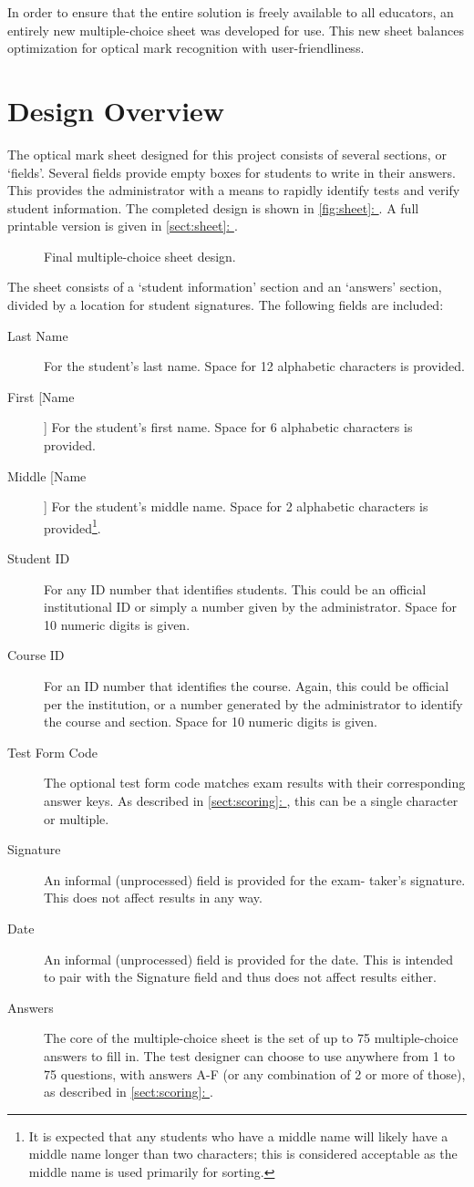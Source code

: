 \documentclass[12pt, letterpaper]{report}
\newcommand*{\sectionref}[1]{\hypersetup{linkcolor=usfgreen}\hyperref[{#1}]{\ref*{#1}: \nameref*{#1}}}
\newcommand*{\itemref}[1]{\hypersetup{linkcolor=usfgreen}\hyperref[{#1}]{\autoref*{#1}: \nameref*{#1}}}
\newcommand*{\boxedimage}[1]{\fbox{\texttt{[image: \#1]}}}
\newcommand{\fig}[3]{
  \begin{figure}[h]
    \caption{#1}
    \label{#3}
    \centering
    \boxedimage{#2}
  \end{figure}
}
\begin{document}
In order to ensure that the entire solution is freely available to all
educators, an entirely new multiple-choice sheet was developed for use.
This new sheet balances optimization for optical mark recognition with
user-friendliness.
\section{Design Overview}
The optical mark sheet designed for this project consists of several sections,
or `fields'. Several fields provide empty boxes for students to write in their
answers. This provides the administrator with a means to rapidly identify tests
and verify student information. The completed design is shown in
\itemref{fig:sheet}. A full printable version is given in \sectionref{sect:sheet}.

\fig{Final multiple-choice sheet design.}{sheet.png}{fig:sheet}

The sheet consists of a `student information' section and an `answers' section,
divided by a location for student signatures. The following fields are
included:
\begin{description}
  \item[Last Name] For the student's last name. Space for 12 alphabetic
  characters is provided.
  \item[First [Name]] For the student's first name. Space for 6 alphabetic
  characters is provided.
  \item[Middle [Name]] For the student's middle name. Space for 2 alphabetic
  characters is provided\footnote{It is expected that any students who have a
  middle name will likely have a middle name longer than two characters; this
  is considered acceptable as the middle name is used primarily for sorting.}.
  \item[Student ID] For any ID number that identifies students. This could be an
  official institutional ID or simply a number given by the administrator. Space
  for 10 numeric digits is given.
  \item[Course ID] For an ID number that identifies the course. Again, this
  could be official per the institution, or a number generated by the
  administrator to identify the course and section. Space for 10 numeric digits
  is given.
  \item[Test Form Code] The optional test form code matches exam results with
  their corresponding answer keys. As described in \sectionref{sect:scoring}, this can
  be a single character or multiple.
  \item[Signature] An informal (unprocessed) field is provided for the exam-
  taker's signature. This does not affect results in any way.
  \item[Date] An informal (unprocessed) field is provided for the date. This is
  intended to pair with the Signature field and thus does not affect results
  either.
  \item[Answers] The core of the multiple-choice sheet is the set of up to 75
  multiple-choice answers to fill in. The test designer can choose to use
  anywhere from 1 to 75 questions, with answers A-F (or any combination of 2 or
  more of those), as described in \sectionref{sect:scoring}.
\end{description}
\end{document}
